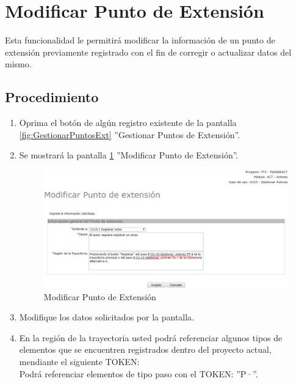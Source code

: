 \hypertarget{cv:modificarPExt}{\section{Modificar Punto de Extensión}} \label{sec:modificarPExt}

	Esta funcionalidad le permitirá modificar la información de un punto de extensión previamente registrado con el fin de corregir o actualizar datos del mismo. 

		\subsection{Procedimiento}

			\begin{enumerate}
	
			\item Oprima el botón \IUEditar{} de algún registro existente de la pantalla \ref{fig:GestionarPuntosExt} ''Gestionar Puntos de Extensión''.
	
			\item Se mostrará la pantalla \ref{fig:modificarPExt} ''Modificar Punto de Extensión''.
			
			\begin{figure}[htbp!]
				\begin{center}
					\includegraphics[scale=0.5]{roles/lider/puntosExtension/pantallas/IU6-1-4-2modificarPuntosExt}
					\caption{Modificar Punto de Extensión}
					\label{fig:modificarPExt}
				\end{center}
			\end{figure}
		
			\item Modifique los datos solicitados por la pantalla.
			
			\item En la región de la trayectoria usted podrá referenciar algunos tipos de elementos que se encuentren registrados dentro del proyecto actual, mendiante el siguiente TOKEN: \\Podrá referenciar elementos de tipo paso con el TOKEN: ''P·''.
						

\end{enumerate}
